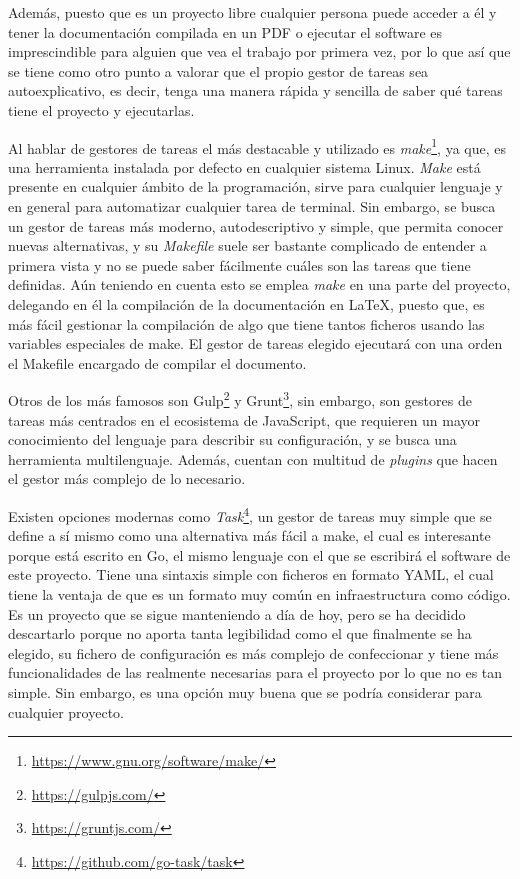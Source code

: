Además, puesto que es un proyecto libre cualquier persona puede acceder a él y
tener la documentación compilada en un PDF o ejecutar el software es
imprescindible para alguien que vea el trabajo por primera vez, por lo que así
que se tiene como otro punto a valorar que el propio gestor de tareas sea
autoexplicativo, es decir, tenga una manera rápida y sencilla de saber qué
tareas tiene el proyecto y ejecutarlas.

Al hablar de gestores de tareas el más destacable y utilizado es
\textit{make}\footnote{\url{https://www.gnu.org/software/make/}}, ya que, es una
herramienta instalada por defecto en cualquier sistema Linux. \textit{Make} está
presente en cualquier ámbito de la programación, sirve para cualquier
lenguaje y en general para automatizar cualquier tarea de terminal. Sin embargo,
se busca un gestor de tareas más moderno, autodescriptivo y simple, que permita
conocer nuevas alternativas, y su \textit{Makefile} suele ser bastante
complicado de entender a primera vista y no se puede saber fácilmente cuáles son
las tareas que tiene definidas. Aún teniendo en cuenta esto se emplea
\textit{make} en una parte del proyecto, delegando en él la compilación de la
documentación en LaTeX, puesto que, es más fácil gestionar la compilación de
algo que tiene tantos ficheros usando las variables especiales de make. El
gestor de tareas elegido ejecutará con una orden el Makefile encargado de
compilar el documento.

Otros de los más famosos son Gulp\footnote{\url{https://gulpjs.com/}} y
Grunt\footnote{\url{https://gruntjs.com/}}, sin embargo, son gestores de tareas
más centrados en el ecosistema de JavaScript, que requieren un mayor
conocimiento del lenguaje para describir su configuración, y se busca una
herramienta multilenguaje. Además, cuentan con multitud de \textit{plugins} que
hacen el gestor más complejo de lo necesario.

Existen opciones modernas como
\textit{Task}\footnote{\url{https://github.com/go-task/task}}, un gestor de
tareas muy simple que se define a sí mismo como una alternativa más fácil a
make, el cual es interesante porque está escrito en Go, el mismo lenguaje con el
que se escribirá el software de este proyecto. Tiene una sintaxis simple con
ficheros en formato YAML, el cual tiene la ventaja de que es un formato muy
común en infraestructura como código. Es un proyecto que se sigue
manteniendo a día de hoy, pero se ha decidido descartarlo porque no aporta tanta
legibilidad como el que finalmente se ha elegido, su fichero de configuración es
más complejo de confeccionar y tiene más funcionalidades de las realmente
necesarias para el proyecto por lo que no es tan simple. Sin embargo, es una
opción muy buena que se podría considerar para cualquier proyecto.

